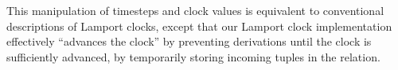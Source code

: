 This manipulation of timesteps and clock values is equivalent to
conventional descriptions of Lamport clocks, except that our Lamport
clock implementation effectively ``advances the clock'' by preventing derivations until the clock is sufficiently advanced, by temporarily storing incoming tuples
in the  relation.


